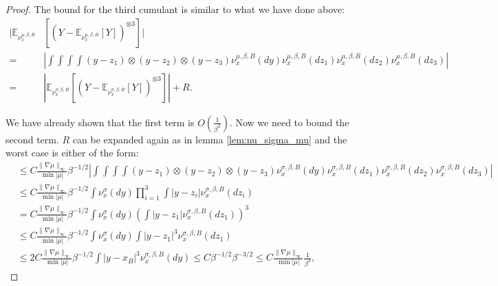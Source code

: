 \documentclass[10pt,a4paper]{amsart}
\begin{document}
\begin{proof}
The bound for the third cumulant is similar to what we have done above:
\begin{align*}
|\mathbb{E}_{\nu_x^{\mu, \beta, B}}&[\left(Y-\mathbb{E}_{\nu_x^{\mu, \beta, B}}[Y]\right)^{\otimes 3}]|\\
=&\left|\int \int\int\int (y-z_1)\otimes(y-z_2)\otimes(y-z_3) \nu_x^{\mu, \beta, B}(dy) \nu_x^{\mu, \beta, B}(dz_1) \nu_x^{\mu, \beta, B}(dz_2) \nu_x^{\mu, \beta, B}(dz_3)\right| \\
=&|\mathbb{E}_{\nu_x^{\sigma, \beta, B}}[\left(Y-\mathbb{E}_{\nu_x^{\sigma, \beta, B}}[Y]\right)^{\otimes 3}]|+R.
\end{align*}

We have already shown that the first term is $O(\frac{1}{\beta^2})$. Now we need to bound the second term. $R$ can be expanded again as in lemma \ref{lem:nu_sigma_mu} and the worst case is either of the form:
\begin{align*}
&\leq C\frac{\|\nabla \mu\|_\infty}{\min |\mu|}\beta^{-1/2}\left|\int\int\int\int (y-z_1)\otimes(y-z_2)\otimes(y-z_3) \nu_x^{\sigma, \beta, B}(dy) \nu_x^{\sigma, \beta, B}(dz_1) \nu_x^{\sigma, \beta, B}(dz_2) \nu_x^{\sigma, \beta, B}(dz_3)\right|\\
&\leq C\frac{\|\nabla \mu\|_\infty}{\min |\mu|}\beta^{-1/2}\int \nu_x^\sigma(dy )\prod_{i=1}^3 \int |y-z_i| \nu_x^{\sigma, \beta, B}(dz_i)\\
&= C\frac{\|\nabla \mu\|_\infty}{\min |\mu|}\beta^{-1/2}\int \nu_x^\sigma(dy )\left( \int |y-z_1| \nu_x^{\sigma, \beta, B}(dz_1)\right)^3\\
&\leq  C\frac{\|\nabla \mu\|_\infty}{\min |\mu|}\beta^{-1/2}\int \nu_x^\sigma(dy )\int |y-z_1| ^3\nu_x^{\sigma, \beta, B}(dz_1)\\
&\leq 2 C\frac{\|\nabla \mu\|_\infty}{\min |\mu|}\beta^{-1/2}\int |y-x_B|^3\nu_x^{\sigma, \beta, B}(dy)\leq C\beta^{-1/2} \beta^{-3/2}\leq C\frac{\|\nabla \mu\|_\infty}{\min |\mu|}\frac{1}{\beta^2},
\end{align*} 


\end{proof}
\end{document}
